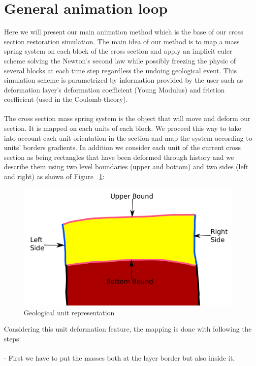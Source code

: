 \documentclass[12pt, a4paper]{report} %
\begin{document}
\section{General animation loop}
\label{sec:generalanimation}
Here we will present our main animation method which is the base of our cross section restoration simulation. 
The main idea of our method is to map a mass spring system on each block of the cross section and apply an implicit euler scheme solving the Newton's second law while possibly freezing the physic of several blocks at each time step regardless the undoing geological event. 
This simulation scheme is parametrized by information provided by the user such as deformation layer's deformation coefficient (Young Modulus) and friction coefficient (used in the Coulomb theory).\\\\
The cross section mass spring system is the object that will move and deform our section. It is mapped on each units of each block. We proceed this way to take into account each unit orientation in the section and map the system according to units' borders gradients. In addition we consider each unit of the current cross section as being rectangles that have been deformed through history and we describe them using two level boundaries (upper and bottom) and two sides (left and right) as shown of Figure ~\ref{unitdecr}:
 \begin{figure}[H]
	\centering
	\includegraphics[scale=0.3]{unitDescriptionEdit.png}
	\caption{Geological unit representation}
	\label{unitdecr}
\end{figure}
Considering this unit deformation feature, the mapping is done with following the steps:	\\\\		
\indent	- First we have to put the masses both at the layer border but also inside it.\\\\
\end{document}

